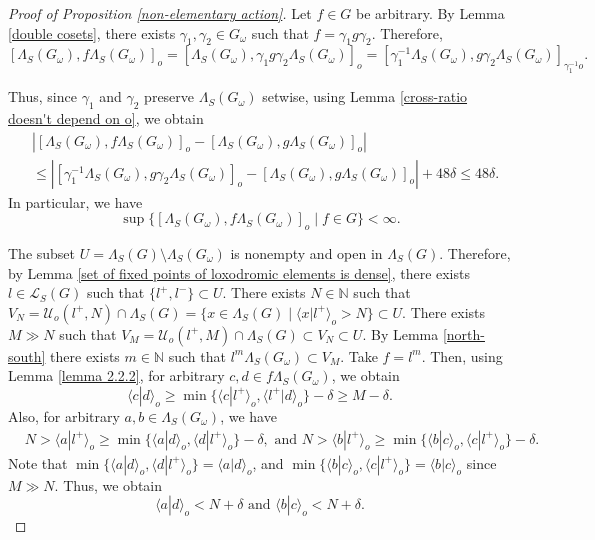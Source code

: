 \documentclass[11pt,letterpaper]{article}
\newcommand{\NN}{\mathbb{N}}
\renewcommand{\l}{\langle}
\renewcommand{\r}{\rangle}
\theoremstyle{definition}
\theoremstyle{remark}
\begin{document}
\begin{proof}[Proof of Proposition \ref{non-elementary action}]
 Let $f \in G$ be arbitrary. By Lemma \ref{double cosets}, there exists $\gamma_1, \gamma_2 \in G_\omega$ such that $f=\gamma_1g\gamma_2$. Therefore, $$
 [\Lambda_S(G_\omega),f\Lambda_S(G_\omega)]_o= [\Lambda_S(G_\omega),\gamma_1g\gamma_2\Lambda_S(G_\omega)]_o=[\gamma_1^{-1}\Lambda_S(G_\omega), g\gamma_2\Lambda_S(G_\omega)]_{\gamma_1^{-1}o}.
$$

Thus, since $\gamma_1$ and $\gamma_2$ preserve $\Lambda_S(G_\omega)$ setwise, using Lemma \ref{cross-ratio doesn't depend on o}, we obtain
$$
\begin{aligned}
    &|[\Lambda_S(G_\omega),f\Lambda_S(G_\omega)]_o-[\Lambda_S(G_\omega),g\Lambda_S(G_\omega)]_o|\\
    &\leq|[\gamma_1^{-1}\Lambda_S(G_\omega), g\gamma_2\Lambda_S(G_\omega)]_o-[\Lambda_S(G_\omega),g\Lambda_S(G_\omega)]_o|+48 \delta \leq 48\delta.
\end{aligned}
$$ 
In particular, we have
\begin{equation}\label{distance is bounded}
\sup\{[\Lambda_S(G_\omega),f\Lambda_S(G_\omega)]_o \mid f \in G \} < \infty.
\end{equation}

The subset $U=\Lambda_S(G) \setminus \Lambda_S(G_\omega)$ is nonempty and open in $\Lambda_S(G)$. Therefore, by Lemma \ref{set of fixed points of loxodromic elements is dense}, there exists $l \in \mathcal{L}_S(G)$ such that $\{l^+, l^- \} \subset U$. There exists $N \in \NN$ such that $V_N=\mathcal U_o(l^+, N) \cap \Lambda_S(G) =\{ x \in \Lambda_S(G) \mid  \l x| l^+ \r_o > N \} \subset U$. There exists $M \gg N$ such
that $V_M = \mathcal{U}_o(l^+,M) \cap \Lambda_S(G) \subset V_N \subset U$.
By Lemma \ref{north-south} there exists $m \in \NN$ such that $l^m\Lambda_S(G_\omega) \subset V_M$. Take $f=l^m$. Then, using Lemma \ref{lemma 2.2.2}, for arbitrary $c, d \in f\Lambda_S(G_\omega)$, we obtain
\begin{equation}\label{dot product c d is large}
\l c|d \r_o \geq \min\{\l c|l^+ \r_o, \l l^+|d \r_o \} -\delta \geq M -\delta.
\end{equation}
Also, for arbitrary $a, b \in \Lambda_S(G_\omega)$, we have
$$
\begin{aligned}
& N > \l a | l^+ \r_o \geq \min\{ \l a | d \r_o, \l d| l^+ \r_o \} - \delta, \text{ and } N > \l b | l^+ \r_o \geq \min\{ \l b | c\r_o, \l c| l^+ \r_o \} - \delta.
\end{aligned}
$$
Note that $\min\{ \l a | d \r_o, \l d| l^+\r_o \}=\l a | d \r_o$, and $\min\{ \l b| c \r_o, \l c| l^+ \r_o \}=\l b| c \r_o$ since $M \gg N$.
Thus, we obtain
\begin{equation}\label{dot products ad and bc are bounded}
\l a | d \r_o < N+\delta \text{ and } \l b| c \r_o < N+\delta.    
\end{equation}


\end{proof}
\end{document}
